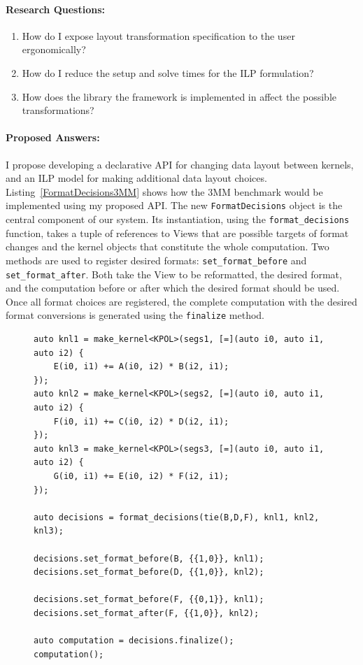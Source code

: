\documentclass{article}
\begin{document}
\paragraph{Research Questions:}

\begin{enumerate}[label=Q2.\arabic*]
\item How do I expose layout transformation specification to the user ergonomically?\label{q:ergo}
\item How do I reduce the setup and solve times for the ILP formulation? \label{q:overhead2}
\item How does the library the framework is implemented in affect the possible transformations? \label{q:PossibleTransformations}
\end{enumerate}

\paragraph{Proposed Answers:}

I propose developing a declarative API for changing data layout between kernels, and an ILP model for making additional data layout choices.
Listing~\ref{FormatDecisions3MM} shows how the 3MM benchmark would be implemented using my proposed API. 
The new \verb.FormatDecisions. object is the central component of our system. 
Its instantiation, using the \verb.format_decisions. function, takes a tuple of references to Views that are possible targets of format changes and the kernel objects that constitute the whole computation.
Two methods are used to register desired formats: \verb.set_format_before. and \verb.set_format_after..
Both take the View to be reformatted, the desired format, and the computation before or after which the desired format should be used.
Once all format choices are registered, the complete computation with the desired format conversions is generated using the \verb.finalize. method.

\begin{figure}
\begin{lstlisting}[caption={The 3MM benchmark implemented using FormatDecisions.},
    label={FormatDecisions3MM}]
auto knl1 = make_kernel<KPOL>(segs1, [=](auto i0, auto i1, auto i2) {
    E(i0, i1) += A(i0, i2) * B(i2, i1);
});
auto knl2 = make_kernel<KPOL>(segs2, [=](auto i0, auto i1, auto i2) {
    F(i0, i1) += C(i0, i2) * D(i2, i1);
});
auto knl3 = make_kernel<KPOL>(segs3, [=](auto i0, auto i1, auto i2) {
    G(i0, i1) += E(i0, i2) * F(i2, i1);
});

auto decisions = format_decisions(tie(B,D,F), knl1, knl2, knl3);

decisions.set_format_before(B, {{1,0}}, knl1);
decisions.set_format_before(D, {{1,0}}, knl2);

decisions.set_format_before(F, {{0,1}}, knl1);
decisions.set_format_after(F, {{1,0}}, knl2);

auto computation = decisions.finalize();
computation();
\end{lstlisting}
\end{figure}
\end{document}
